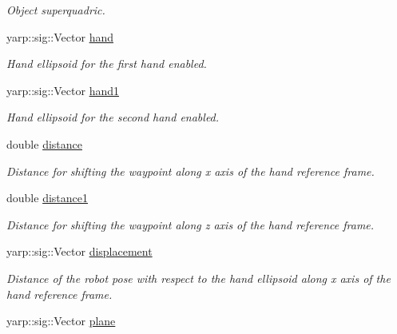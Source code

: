 \begin{DoxyCompactItemize}
\begin{DoxyCompactList}\small\item\em Object superquadric. \end{DoxyCompactList}\item 
yarp\+::sig\+::\+Vector \hyperlink{classGraspingModule_af8308a8938957b4bb50c260dc42d7b27}{hand}\label{classGraspingModule_af8308a8938957b4bb50c260dc42d7b27}

\begin{DoxyCompactList}\small\item\em Hand ellipsoid for the first hand enabled. \end{DoxyCompactList}\item 
yarp\+::sig\+::\+Vector \hyperlink{classGraspingModule_a0b4986d666ef55b1c769d1b02b49c86f}{hand1}\label{classGraspingModule_a0b4986d666ef55b1c769d1b02b49c86f}

\begin{DoxyCompactList}\small\item\em Hand ellipsoid for the second hand enabled. \end{DoxyCompactList}\item 
double \hyperlink{classGraspingModule_af1912ddc2800fb3101e98a99d3b04b5b}{distance}\label{classGraspingModule_af1912ddc2800fb3101e98a99d3b04b5b}

\begin{DoxyCompactList}\small\item\em Distance for shifting the waypoint along x axis of the hand reference frame. \end{DoxyCompactList}\item 
double \hyperlink{classGraspingModule_aacb0581ba76204e825aee632cf9679e4}{distance1}\label{classGraspingModule_aacb0581ba76204e825aee632cf9679e4}

\begin{DoxyCompactList}\small\item\em Distance for shifting the waypoint along z axis of the hand reference frame. \end{DoxyCompactList}\item 
yarp\+::sig\+::\+Vector \hyperlink{classGraspingModule_a52131b73f3688ab8524f37b8e1945717}{displacement}\label{classGraspingModule_a52131b73f3688ab8524f37b8e1945717}

\begin{DoxyCompactList}\small\item\em Distance of the robot pose with respect to the hand ellipsoid along x axis of the hand reference frame. \end{DoxyCompactList}\item 
yarp\+::sig\+::\+Vector \hyperlink{classGraspingModule_a234e3ab635ba9b581e6877519dc633b6}{plane}\label{classGraspingModule_a234e3ab635ba9b581e6877519dc633b6}


\end{DoxyCompactItemize}
